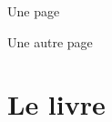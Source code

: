 \documentclass[openany]{book}
\begin{document}
\frontmatter

Une page

\newpage

Une autre page

\mainmatter
\patchcmd{\part}
  {\secdef}
  {\thispagestyle{empty}%
  \setcounter{par@page}{0}%
  \secdef}
  {}{}

\part{Le livre}


\begin{pages}
  \begin{Leftside}
    \beginnumbering
    \pstart
    \lipsum[1]
    \pend
    \endnumbering
  \end{Leftside}
  \begin{Rightside}
    \beginnumbering
    \pstart
    \lipsum[1]
    \pend
    \endnumbering    
  \end{Rightside}
\end{pages}

\Pages
\end{document}
